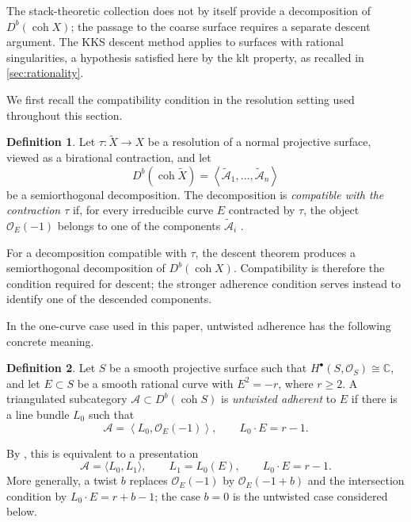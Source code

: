 \documentclass[11pt]{article}
\theoremstyle{plain}
\theoremstyle{definition}
\newtheorem{definition}[definition]{Definition}
\theoremstyle{remark}
\newcommand{\C}{\mathbb C}
\newcommand{\Db}{D^b}
\newcommand{\coh}{\operatorname{coh}}
\newcommand{\OO}{\mathcal O}
\begin{document}
The stack-theoretic collection does not by itself provide a decomposition
of \(\Db(\coh X)\); the passage to the coarse surface requires a separate
descent argument. The KKS descent method
applies to surfaces with rational singularities, a hypothesis satisfied
here by the klt property, as recalled in \cref{sec:rationality}.

We first recall the compatibility condition in the resolution setting used
throughout this section.

\begin{definition}\label{def:kks-compatibility}
Let \(\tau:\widetilde X\to X\) be a resolution of a normal projective surface,
viewed as a birational contraction, and let
\[
\Db(\coh\widetilde X)
=
\left\langle
\widetilde{\mathcal A}_1,\dots,\widetilde{\mathcal A}_n
\right\rangle
\]
be a semiorthogonal decomposition. The decomposition is \emph{compatible
with the contraction \(\tau\)} if, for every irreducible curve \(E\)
contracted by \(\tau\), the object \(\OO_E(-1)\) belongs to one of the
components \(\widetilde{\mathcal A}_i\)
\cite[Definition~2.7]{KKS2020}.
\end{definition}

For a decomposition compatible with \(\tau\), the descent theorem
\cite[Theorem~2.12]{KKS2020} produces a semiorthogonal decomposition of
\(\Db(\coh X)\). Compatibility is therefore the condition required for
descent; the stronger adherence condition serves instead to identify one of
the descended components.

In the one-curve case used in this paper, untwisted adherence has the
following concrete meaning.

\begin{definition}
Let \(S\) be a smooth projective surface such
that \(H^\bullet(S,\OO_S)\cong\C\), and let \(E\subset S\) be a smooth
rational curve with \(E^2=-r\), where \(r\geq2\). A triangulated subcategory
\(\mathcal A\subset\Db(\coh S)\) is \emph{untwisted adherent} to \(E\) if
there is a line bundle \(L_0\) such that
\[
\mathcal A
=
\left\langle
L_0,\OO_E(-1)
\right\rangle,
\qquad
L_0\cdot E=r-1.
\]
\end{definition}

By \cite[Lemma~3.5, Definition~3.6, and Example~3.7]{KKS2020}, this is
equivalent to a presentation
\[
\mathcal A=\langle L_0,L_1\rangle,
\qquad
L_1=L_0(E),
\qquad
L_0\cdot E=r-1.
\]
More generally, a twist \(b\) replaces \(\OO_E(-1)\) by
\(\OO_E(-1+b)\) and the intersection condition by
\(L_0\cdot E=r+b-1\); the case \(b=0\) is the untwisted case considered
below.
\end{document}
